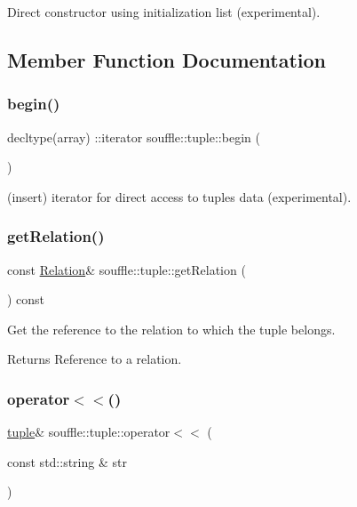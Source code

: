 Direct constructor using initialization list (experimental). 

\subsection{Member Function Documentation}
\mbox{\label{classsouffle_1_1tuple_a4b74ce0412f8d5aa1ea8614be5ad8579}} 
\subsubsection{\texorpdfstring{begin()}{begin()}}
{\footnotesize\ttfamily decltype(array) \+::iterator souffle\+::tuple\+::begin (\begin{DoxyParamCaption}{ }\end{DoxyParamCaption})\hspace{0.3cm}{\ttfamily [inline]}}

(insert) iterator for direct access to tuple\textquotesingle{}s data (experimental). \mbox{\label{classsouffle_1_1tuple_a0ab9c3b37d368d4372e7e27fdbf20ee6}} 
\subsubsection{\texorpdfstring{get\+Relation()}{getRelation()}}
{\footnotesize\ttfamily const \hyperlink{classsouffle_1_1_relation}{Relation}\& souffle\+::tuple\+::get\+Relation (\begin{DoxyParamCaption}{ }\end{DoxyParamCaption}) const\hspace{0.3cm}{\ttfamily [inline]}}

Get the reference to the relation to which the tuple belongs. \begin{DoxyReturn}{Returns}
Reference to a relation. 
\end{DoxyReturn}
\mbox{\label{classsouffle_1_1tuple_a043d1084b36f2808d79d5e8aca86d4b8}} 
\subsubsection{\texorpdfstring{operator$<$$<$()}{operator<<()}\hspace{0.1cm}{\footnotesize\ttfamily [1/2]}}
{\footnotesize\ttfamily \hyperlink{classsouffle_1_1tuple}{tuple}\& souffle\+::tuple\+::operator$<$$<$ (\begin{DoxyParamCaption}\item[{const std\+::string \&}]{str }\end{DoxyParamCaption})\hspace{0.3cm}{\ttfamily [inline]}}

